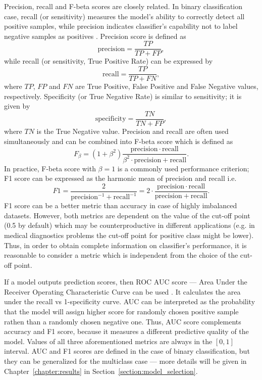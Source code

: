 \documentclass[magisterska, english]{pwr_wmat_praca_dyplomowa}
\theoremstyle{plain}
\numberwithin{theorem}{chapter}
\theoremstyle{definition}
\numberwithin{theorem}{chapter}
\begin{document}
Precision, recall and F-beta scores are closely related. In binary classification case, recall (or sensitivity) measures the model's ability to correctly detect all positive samples, while precision indicates classifier's capability not to label negative samples as positives \cite{sklearn}. Precision score \cite{sklearn} is defined as
\begin{equation}
    \mathrm{precision} = \frac{TP}{TP+FP},
\end{equation}
while recall (or sensitivity, True Positive Rate) can be expressed by
\begin{equation}
    \mathrm{recall} = \frac{TP}{TP+FN},
\end{equation}
where $TP$, $FP$ and $FN$ are True Positive, False Positive and False Negative values, respectively. Specificity (or True Negative Rate) is similar to sensitivity; it is given by
\begin{equation}
    \mathrm{specificity} = \frac{TN}{TN+FP},
\end{equation}
where $TN$ is the True Negative value. Precision and recall are often used simultaneously and can be combined into F-beta score \cite{sklearn} which is defined as
\begin{equation}\label{eq:beta}
F_{\beta} = (1+\beta^2)\frac{\mathrm{precision}\cdot \mathrm{recall}}{\beta^2\cdot \mathrm{precision} + \mathrm{recall}}.
\end{equation}
In practice, F-beta score with $\beta = 1$ is a commonly used performance criterion; F1 score can be expressed as the harmonic mean of precision and recall i.e.
\begin{equation}\label{eq:F1}
    F1 = \frac{2}{\mathrm{precision}^{-1} + \mathrm{recall}^{-1}} = 2\cdot \frac{\mathrm{precision}\cdot \mathrm{recall}}{\mathrm{precision} + \mathrm{recall}}.
\end{equation}
F1 score can be a better metric than accuracy in case of highly imbalanced datasets. However, both metrics are dependent on the value of the cut-off point (0.5 by default) which may be counterproductive in different applications (e.g. in medical diagnostics problems the cut-off point for positive class might be lower). Thus, in order to obtain complete information on classifier's performance, it is reasonable to consider a metric which is independent from the choice of the cut-off point.

If a model outputs prediction scores, then ROC AUC score --- Area Under the Receiver Operating Characteristic Curve can be used \cite{sklearn}. It calculates the area under the recall vs 1-specificity curve. AUC can be interpreted as the probability that the model will assign higher score for randomly chosen positive sample rathen than a randomly chosen negative one. Thus, AUC score complements accuracy and F1 score, because it measures a different predictive quality of the model. Values of all three aforementioned metrics are always in the $[0,1]$ interval. AUC and F1 scores are defined in the case of binary classification, but they can be generalized for the multiclass case --- more details will be given in Chapter~\ref{chapter:results} in Section~\ref{section:model_selection}.
\end{document}
